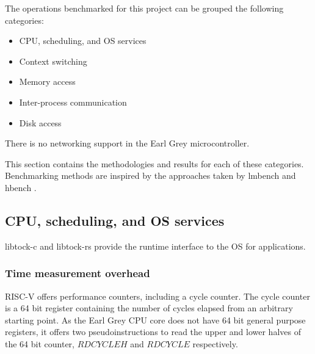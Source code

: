 \documentclass{article}
\begin{document}
The operations benchmarked for this project can be grouped the following categories:

\begin{itemize}
    \item CPU, scheduling, and OS services
    \item Context switching
    \item Memory access
    \item Inter-process communication
    \item Disk access
\end{itemize}

There is no networking support in the Earl Grey microcontroller.

This section contains the methodologies and results for each of these categories. Benchmarking methods are inspired by the approaches taken by lmbench \cite{lmbench} and hbench \cite{hbench}.


\subsection{CPU, scheduling, and OS services}

libtock-c and libtock-rs provide the runtime interface to the OS for applications. 

\subsubsection{Time measurement overhead} \label{subsubsec:time-measurement}

RISC-V offers performance counters, including a cycle counter. The cycle counter is a 64 bit register containing the number of cycles elapsed from an arbitrary starting point. As the Earl Grey CPU core does not have 64 bit general purpose registers, it offers two pseudoinstructions to read the upper and lower halves of the 64 bit counter, $RDCYCLEH$ and $RDCYCLE$ respectively.
\end{document}
